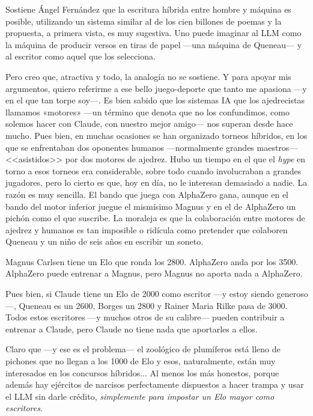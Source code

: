 \documentclass[11pt,a4paper]{article}
\begin{document}
Sostiene Ángel Fernández que la escritura híbrida entre hombre y máquina es posible, utilizando un sistema similar al de los cien billones de poemas y la propuesta, a primera vista, es muy sugestiva. Uno puede imaginar al LLM como la máquina de producir versos en tiras de papel ---una máquina de Queneau--- y al escritor como aquel que los selecciona. 

Pero creo que, atractiva y todo, la analogía no se sostiene. Y para apoyar mis argumentos, quiero referirme a ese bello juego-deporte que tanto me apasiona ---y en el que tan torpe soy---. Es bien sabido que los sistemas IA que los ajedrecistas llamamos «motores» ---un término que denota que no los confundimos, como solemos hacer con Claude, con nuestro mejor amigo--- nos superan desde hace mucho. Pues bien, en muchas ocasiones se han organizado torneos híbridos, en los que se enfrentaban dos oponentes humanos ---normalmente grandes maestros--- <<asistidos>> por dos motores de ajedrez. Hubo un tiempo en el que el \emph{hype} en torno a esos torneos era considerable, sobre todo cuando involucraban a grandes jugadores, pero lo cierto es que, hoy en día, no le interesan demasiado a nadie. La razón es muy sencilla. El bando que juega con AlphaZero gana, aunque en el bando del motor inferior juegue el mismísimo Magnus y en el de AlphaZero un pichón como el que suscribe. La moraleja es que la colaboración entre motores de ajedrez y humanos es tan imposible o ridícula como pretender que colaboren Queneau y un niño de seis años en escribir un soneto. 

Magnus Carlsen tiene un Elo que ronda los 2800. AlphaZero anda por los 3500. AlphaZero puede entrenar a Magnus, pero Magnus no aporta nada a AlphaZero.

Pues bien, si Claude tiene un Elo de 2000 como escritor ---y estoy siendo generoso---, Queneau es un 2600, Borges un 2800 y Rainer Maria Rilke pasa de 3000. Todos estos escritores ---y muchos otros de su calibre--- pueden contribuir a entrenar a Claude, pero Claude no tiene nada que aportarles a ellos. 

Claro que ---y ese es el problema--- el zoológico de plumíferos está lleno de pichones que no llegan a los 1000 de Elo y esos, naturalmente, están muy interesados en los concursos híbridos... Al menos los más honestos, porque además hay ejércitos de narcisos perfectamente dispuestos a hacer trampa y usar el LLM sin darle crédito, \emph{simplemente para impostar un Elo mayor como escritores}. 
\end{document}

